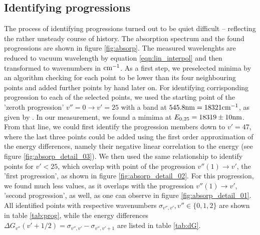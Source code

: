 \subsection{Identifying progressions}
The process of identifying progressions turned out to be quiet difficult – reflecting the 
rather unsteady course of history. 
The absorption spectrum and the found progressions are shown in figure \ref{fig:absorp}.
The measured wavelenghts are reduced to vacuum wavelength by equation \eqref{eqn:lin_interpol} 
and then transformed to wavenumbers in $\mathrm{cm^{-1}}$. 
As a first step, we preselected minima by an algorithm checking for each point to be lower than 
its four neighbouring points and added further points by hand later on. For identifying corrisponding 
progression to each of the selected points, we used the starting point of the 'zeroth progression' 
$v'' = 0  \rightarrow v' = 25$ with a band at $545.8 \mathrm{nm} = 18321 \mathrm{cm^{-1}}$, as given by \cite{}. In our 
measurement, we found a mimima at $E_{0, 25} = 18319 \pm 10\mathrm{nm}$. From that line, we could first 
identify the progression members down to $v' = 47$, where the last three points could be added using 
the first order approximation of the energy differences, namely their negative linear correlation 
to the energy (see figure \ref{fig:absorp_detail_03}). We then used the same relationship to identify 
points for $v' < 25$, which overlap with point of the progression $v''(1) \rightarrow v'$, the 
'first progression', 
as shown in figure \ref{fig:absorp_detail_02}. For this progression, we found much less values, as 
it overlaps with the progression $v''(1) \rightarrow v'$, 'second progression', as well, as one can 
observe in figure \ref{fig:absorp_detail_01}. All identified points with respective wavenumbers 
$\sigma_{v'', v'}, v'' \in \{0, 1, 2\}$ are shown in table \ref{tab:prog}, 
while the energy differences $\Delta G_{v''}(v' + 1 / 2) = \sigma_{v'', v'} - \sigma_{v'', v' + 1}$ are 
listed in table \ref{tab:dG}.

